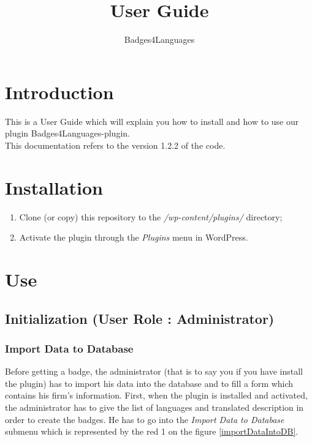 \documentclass[a4paper, 12pt]{report}
\title{User Guide}
\author{Badges4Languages}
\begin{document}
\maketitle


\newpage
\thispagestyle{empty}
\hfill
\newpage
\addtocounter{page}{-1}

\newpage
	\setcounter{page}{1}
	\tableofcontents
	
	
\newpage
	\chapter*{Introduction}
	
	This is a User Guide which will explain you how to install and how to use our plugin Badges4Languages-plugin.\\
	
	This documentation refers to the version 1.2.2 of the code.
	





	\chapter{Installation}

	\begin{enumerate}
		\item Clone (or copy) this repository to the \textit{/wp-content/plugins/} directory;
    	\item Activate the plugin through the \textit{Plugins} menu in WordPress.
	\end{enumerate}
	
	
	
	
	
	

	\chapter{Use}
	
		\section{Initialization (User Role : Administrator)}
		
			\subsection{Import Data to Database}
		
	Before getting a badge, the administrator (that is to say you if you have install the plugin) has to import his data into the database and to fill a form which contains his firm's information. First, when the plugin is installed and activated, the administrator has to give the list of languages and translated description in order to create the badges. He has to go into the \textit{Import Data to Database} submenu which is represented by the red 1 on the figure \ref{importDataIntoDB}.
	
\end{document}
